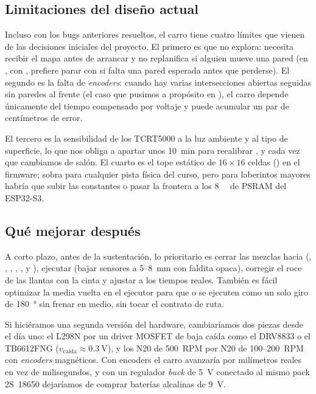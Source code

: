 \subsection{Limitaciones del diseño actual}
\label{subsec:limitaciones}

Incluso con los bugs anteriores resueltos, el carro tiene cuatro límites que vienen de las decisiones iniciales del proyecto. El primero es que no explora: necesita recibir el mapa antes de arrancar y no replanifica si alguien mueve una pared (en , con , prefiere parar con  si falta una pared esperada antes que perderse). El segundo es la falta de \emph{encoders}: cuando hay varias intersecciones abiertas seguidas sin paredes al frente (el caso que pusimos a propósito en ), el carro depende únicamente del tiempo compensado por voltaje y puede acumular un par de centímetros de error.

El tercero es la sensibilidad de los TCRT5000 a la luz ambiente y al tipo de superficie, lo que nos obliga a apartar unos \SI{10}{\minute} para recalibrar ,  y  cada vez que cambiamos de salón. El cuarto es el tope estático de $16\times 16$ celdas () en el firmware; sobra para cualquier pista física del curso, pero para laberintos mayores habría que subir las constantes o pasar la frontera a los \SI{8}{\mega\byte} de PSRAM del ESP32-S3.

\subsection{Qué mejorar después}
\label{subsec:mejoras-futuras}

A corto plazo, antes de la sustentación, lo prioritario es cerrar las mezclas hacia  (, , , , ,  y ), ejecutar  (bajar sensores a 5--\SI{8}{\milli\meter} con faldita opaca), corregir el roce de las llantas con la cinta y ajustar  a los tiempos reales. También es fácil optimizar la media vuelta en el ejecutor para que  o  se ejecuten como un solo giro de \SI{180}{\degree} sin frenar en medio, sin tocar el contrato de ruta.

Si hiciéramos una segunda versión del hardware, cambiaríamos dos piezas desde el día uno: el L298N por un driver MOSFET de baja caída como el DRV8833 o el TB6612FNG ($v_{\text{caida}} \approx \SI{0.3}{\volt}$), y los N20 de 500~RPM por N20 de 100--200~RPM con \emph{encoders} magnéticos. Con encoders el carro avanzaría por milímetros reales en vez de milisegundos, y con un regulador \emph{buck} de \SI{5}{\volt} conectado al mismo pack 2S~18650 dejaríamos de comprar baterías alcalinas de \SI{9}{\volt}.

